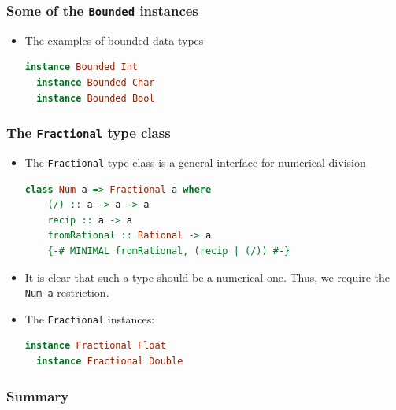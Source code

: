 \documentclass[10pt,pdf,utf8,russian,aspectratio=169]{beamer}
\begin{document}
\begin{frame}[fragile]
  \frametitle{Some of the \verb"Bounded" instances}
\begin{itemize}
  \item The examples of bounded data types
\begin{lstlisting}[language=Haskell]
  instance Bounded Int
  instance Bounded Char
  instance Bounded Bool
\end{lstlisting}
\end{itemize}
\end{frame}

\begin{frame}[fragile]
  \frametitle{The \verb"Fractional" type class}

\begin{itemize}
  \item The \verb"Fractional" type class is a general interface for numerical division
\begin{lstlisting}[language=Haskell]
  class Num a => Fractional a where
    (/) :: a -> a -> a
    recip :: a -> a
    fromRational :: Rational -> a
    {-# MINIMAL fromRational, (recip | (/)) #-}
  \end{lstlisting}
  \item It is clear that such a type should be a numerical one. Thus, we require the \verb"Num a" restriction.
  \item The \verb"Fractional" instances:
  \begin{lstlisting}[language=Haskell]
  instance Fractional Float
  instance Fractional Double
  \end{lstlisting}
\end{itemize}
\end{frame}

\begin{frame}
  \frametitle{Summary}


\end{frame}
\end{document}
